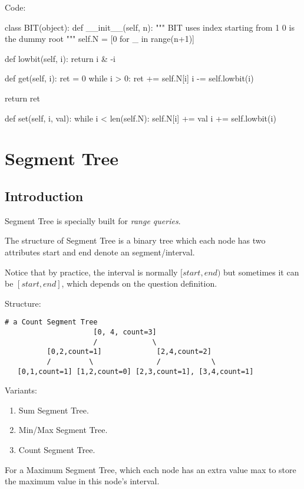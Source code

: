 Code:
\begin{python}
class BIT(object):
    def __init__(self, n):
        """
        BIT uses index starting from 1
        0 is the dummy root 
        """
        self.N = [0 for _ in range(n+1)]

    def lowbit(self, i):
        return i & -i

    def get(self, i):
        ret = 0
        while i > 0:
            ret += self.N[i]
            i -= self.lowbit(i)

        return ret
        
    def set(self, i, val):
        while i < len(self.N):
            self.N[i] += val
            i += self.lowbit(i)
\end{python}


\section{Segment Tree}\label{section:segmentTree}
\subsection{Introduction}
Segment Tree is specially built for \textit{range queries}. 

The structure of Segment Tree is a binary tree which each node has two attributes start and end denote an segment/interval. 

Notice that by practice, the interval is normally $[start, end)$ but sometimes it can be $[start, end]$, which depends on the question definition. 

Structure:  
\begin{lstlisting}[columns=flexible]
# a Count Segment Tree
                     [0, 4, count=3]
                     /             \
          [0,2,count=1]             [2,4,count=2]
          /         \               /            \
   [0,1,count=1] [1,2,count=0] [2,3,count=1], [3,4,count=1]
\end{lstlisting}
Variants:
\begin{enumerate}
\item Sum Segment Tree.
\item Min/Max Segment Tree.
\item Count Segment Tree. 
\end{enumerate}

For a Maximum Segment Tree, which each node has an extra value max to store the maximum value in this node's interval.

